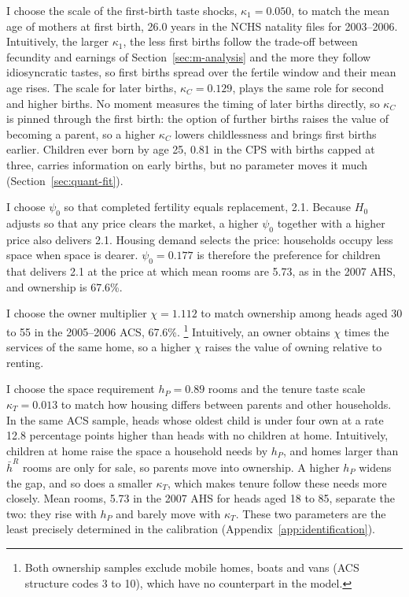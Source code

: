 I choose the scale of the first-birth taste shocks, $\kappa_1=0.050$, to
match the mean age of mothers at first birth, 26.0 years in the NCHS natality
files for 2003--2006. Intuitively, the larger $\kappa_1$, the less first
births follow the trade-off between fecundity and earnings of
Section~\ref{sec:m-analysis} and the more they follow idiosyncratic tastes,
so first births spread over the fertile window and their mean age rises. The scale for later births,
$\kappa_C=0.129$, plays the same role for second and higher births. No
moment measures the timing of later births directly, so $\kappa_C$ is pinned
through the first birth: the option of further births raises the value of
becoming a parent, so a higher $\kappa_C$ lowers childlessness and brings
first births earlier. Children ever born by age 25, 0.81 in the CPS with
births capped at three, carries information on early births, but no
parameter moves it much (Section~\ref{sec:quant-fit}).

I choose $\psi_0$ so that completed fertility equals replacement, 2.1.
Because $H_0$ adjusts so that any price clears the market, a higher $\psi_0$
together with a higher price also delivers 2.1. Housing demand selects the
price: households occupy less space when space is dearer. $\psi_0=0.177$ is
therefore the preference for children that delivers 2.1 at the price at
which mean rooms are 5.73, as in the 2007 AHS, and ownership is 67.6\%.

I choose the owner multiplier $\chi=1.112$ to match ownership among heads
aged 30 to 55 in the 2005--2006 ACS, 67.6\%.%
\footnote{Both ownership samples exclude mobile homes, boats and vans (ACS
structure codes 3 to 10), which have no counterpart in the model.}
Intuitively, an owner obtains $\chi$ times the services of the same home, so
a higher $\chi$ raises the value of owning relative to renting.

I choose the space requirement $h_P=0.89$ rooms and the tenure taste scale
$\kappa_T=0.013$ to match how housing differs between parents and other
households. In the same ACS sample, heads whose oldest child is under four
own at a rate 12.8 percentage points higher than heads with no children at
home. Intuitively, children at home raise the space a household needs by
$h_P$, and homes larger than $\bar h^R$ rooms are only for sale, so parents
move into ownership. A higher $h_P$ widens the gap, and so does a smaller
$\kappa_T$, which makes tenure follow these needs more closely. Mean rooms,
5.73 in the 2007 AHS for heads aged 18 to 85, separate the two: they rise
with $h_P$ and barely move with $\kappa_T$. These two parameters are the
least precisely determined in the calibration
(Appendix~\ref{app:identification}).


